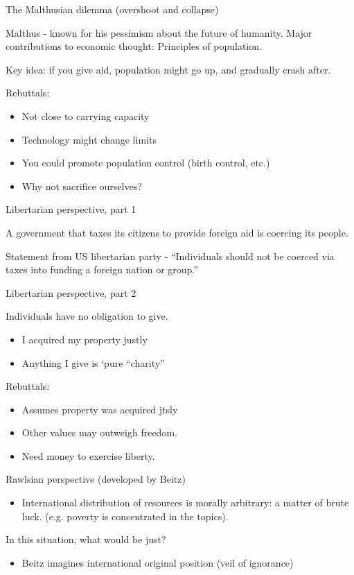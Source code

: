 \documentclass{article}
\begin{document}
The Malthusian dilemma (overshoot and collapse)

Malthus - known for his pessimism about the future of humanity.  Major contributions to economic thought: Principles of population.

Key idea: if you give aid, population might go up, and gradually crash after.

Rebuttals:
\begin{itemize}
  \item Not close to carrying capacity
  \item Technology might change limits
  \item You could promote population control (birth control, etc.)
  \item Why not sacrifice ourselves?
\end{itemize}

Libertarian perspective, part 1

A government that taxes its citizens to provide foreign aid is coercing its people.

Statement from US libertarian party - ``Individuals should not be coerced via taxes into funding a foreign nation or group.''

Libertarian perspective, part 2

Individuals have no obligation to give.
\begin{itemize}
  \item I acquired my property justly
  \item Anything I give is `pure ``charity''
\end{itemize}

Rebuttals:
\begin{itemize}
  \item Assumes property was acquired jtsly
  \item Other values may outweigh freedom.
  \item Need money to exercise liberty.
\end{itemize}

Rawlsian perspective (developed by Beitz)
\begin{itemize}
  \item International distribution of resources is morally arbitrary: a matter of brute luck. (e.g. poverty is concentrated in the topics).
\end{itemize}

In this situation, what would be just?

\begin{itemize}
  \item Beitz imagines international original position (veil of ignorance)
\end{itemize}
\end{document}
